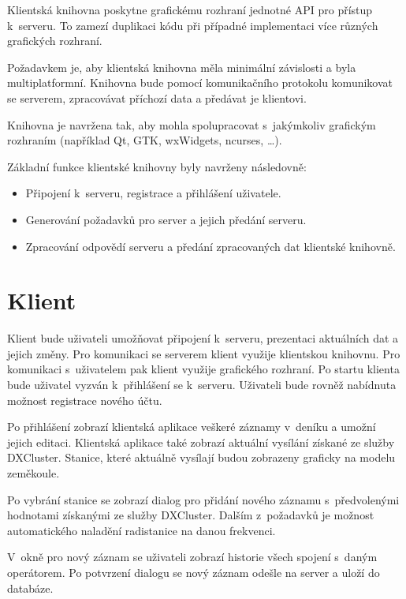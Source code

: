 Klientská knihovna poskytne grafickému rozhraní jednotné API pro přístup
k~serveru. To zamezí duplikaci kódu při případné implementaci více
různých grafických rozhraní.

Požadavkem je, aby klientská knihovna měla minimální závislosti a byla
multiplatformní. Knihovna bude pomocí komunikačního protokolu
komunikovat se serverem, zpracovávat příchozí data a předávat je klientovi.

Knihovna je navržena tak, aby mohla spolupracovat s~jakýmkoliv grafickým
rozhraním (například Qt, GTK, wxWidgets, ncurses, \dots). %

Základní funkce klientské knihovny byly navrženy následovně:

\begin{itemize}
\item Připojení k~serveru, registrace a přihlášení uživatele.
\item Generování požadavků pro server a jejich předání serveru.
\item Zpracování odpovědí serveru a předání zpracovaných dat klientské knihovně.
\end{itemize}

\section{Klient}
\label{navrh_klient}

Klient bude uživateli umožňovat připojení k~serveru, prezentaci aktuálních dat a
jejich změny. Pro komunikaci
se serverem klient využije klientskou knihovnu. Pro komunikaci s~uživatelem pak klient využije grafického rozhraní.
Po startu klienta bude uživatel vyzván k~přihlášení se k~serveru. Uživateli bude rovněž nabídnuta možnost registrace
nového účtu.

Po přihlášení zobrazí klientská aplikace veškeré záznamy v~deníku a umožní
jejich editaci. Klientská aplikace také zobrazí
aktuální vysílání získané ze služby DXCluster. Stanice, které aktuálně vysílají
budou zobrazeny graficky na modelu 
zeměkoule.

Po vybrání stanice se zobrazí dialog pro přidání nového záznamu s~předvolenými
hodnotami získanými ze služby DXCluster. Dalším z~požadavků je možnost
automatického naladění radistanice na danou frekvenci.

V~okně pro nový záznam se uživateli zobrazí historie všech spojení s~daným operátorem.
Po potvrzení dialogu se nový záznam odešle na server a uloží do databáze.

